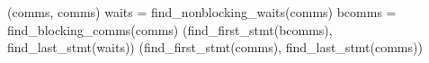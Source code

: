 \begin{algorithm}
{\begin{algorithmic}
\EndFunction

\color{brown}
\State {}
    \State \Return (comms, comms)
    \State waits = find\_nonblocking\_waits(comms)
    \State bcomms = find\_blocking\_comms(comms)
    \State \Return (find\_first\_stmt(bcomms), find\_last\_stmt(waits))
  \Else
    \State \Return (find\_first\_stmt(comms), find\_last\_stmt(comms))
  \EndIf
\EndFunction




\end{algorithmic}}
\end{algorithm}
